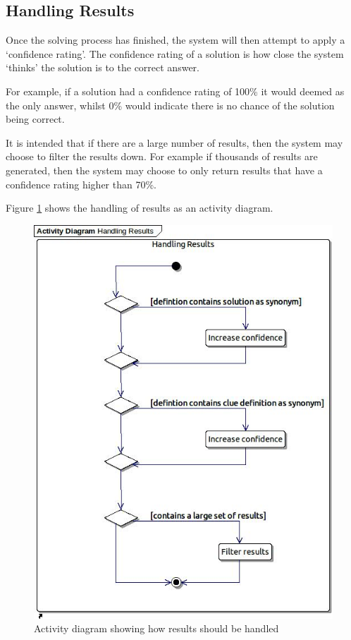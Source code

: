 \subsection{Handling Results} 
\label{sub:results}

Once the solving process has finished, the system will then attempt to apply a 
`confidence rating'. The confidence rating of a solution is how close the system
`thinks' the solution is to the correct answer.

For example, if a solution had a confidence rating of 100\% it would deemed as 
the only answer, whilst 0\% would indicate there is no chance of the solution
being correct.

It is intended that if there are a large number of results, then the system may
choose to filter the results down. For example if thousands of results are 
generated, then the system may choose to only return results that have a 
confidence rating higher than 70\%.

Figure \ref{fig:results_activity} shows the handling of results as an activity 
diagram.

\begin{figure}[H]
  \centering
  \includegraphics[scale=0.6]{activity/handling_results.jpg}
  \caption{Activity diagram showing how results should be handled}
  \label{fig:results_activity}
\end{figure}
